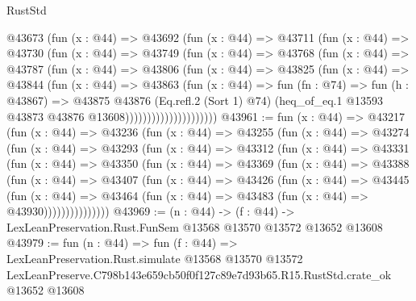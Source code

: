 \begin{lexlean}{RustStd}
\begin{coremodule}
                    @43673
                      (fun (x : @44) =>
                      @43692
                        (fun (x : @44) =>
                        @43711
                          (fun (x : @44) =>
                          @43730
                            (fun (x : @44) =>
                            @43749
                              (fun (x : @44) =>
                              @43768
                                (fun (x : @44) =>
                                @43787
                                  (fun (x : @44) =>
                                  @43806
                                    (fun (x : @44) =>
                                    @43825
                                      (fun (x : @44) =>
                                      @43844
                                        (fun (x : @44) =>
                                        @43863
                                          (fun (x : @44) =>
                                          fun (fn : @74) =>
                                          fun (h : @43867) =>
                                          @43875
                                            @43876
                                            (Eq.refl.{2} (Sort 1) @74)
                                            (heq_of_eq.{1}
                                              @13593
                                              @43873
                                              @43876
                                              @13608)))))))))))))))))))))
@43961 := fun (x : @44) =>
  @43217
    (fun (x : @44) =>
    @43236
      (fun (x : @44) =>
      @43255
        (fun (x : @44) =>
        @43274
          (fun (x : @44) =>
          @43293
            (fun (x : @44) =>
            @43312
              (fun (x : @44) =>
              @43331
                (fun (x : @44) =>
                @43350
                  (fun (x : @44) =>
                  @43369
                    (fun (x : @44) =>
                    @43388
                      (fun (x : @44) =>
                      @43407
                        (fun (x : @44) =>
                        @43426
                          (fun (x : @44) =>
                          @43445
                            (fun (x : @44) =>
                            @43464 (fun (x : @44) => @43483 (fun (x : @44) => @43930)))))))))))))))
@43969 := (n : @44) ->
  (f : @44) -> LexLeanPreservation.Rust.FunSem @13568 @13570 @13572 @13652 @13608
@43979 := fun (n : @44) =>
  fun (f : @44) =>
  LexLeanPreservation.Rust.simulate
    @13568
    @13570
    @13572
    LexLeanPreserve.C798b143e659cb50f0f127c89e7d93b65.R15.RustStd.crate_ok
    @13652
    @13608
\end{coremodule}
\end{lexlean}
